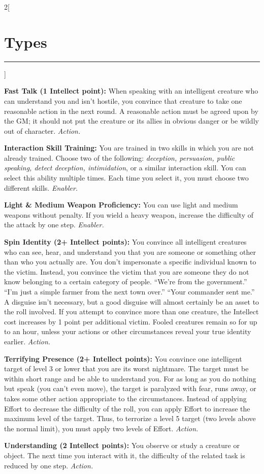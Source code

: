 \documentclass[a4paper,10pt,final]{book}
\newcommand{\HRule}{\rule{\linewidth}{0.5mm}} %
\newcommand{\newSection}[1]{\section*{#1} \addcontentsline{toc}{section}{#1} \label{sec:#1} \HRule}
\newcommand{\itemAbility}[2]{\textcolor{25gray}{\textbullet\textbf{ #1:}} {#2}\par}
\newcommand{\enabler}{\textit{ Enabler.}}
\newcommand{\action}{\textit{ Action.}}
\newenvironment{docsection}[1]
{
  \begin{multicols*}{2}[\newSection{#1}]
}
{
  \end{multicols*}
  \newpage
}
\begin{document}
\begin{docsection}{Types}
\itemAbility{Fast Talk (1 Intellect point)}{When
speaking with an intelligent creature who
can understand you and isn’t hostile,
you convince that creature to take one
reasonable action in the next round. A
reasonable action must be agreed upon by
the GM; it should not put the creature or its
allies in obvious danger or be wildly out of
character.\action}

\itemAbility{Interaction Skill Training}{You are trained in two
skills in which you are not already trained.
Choose two of the following: \textit{deception,
persuasion, public speaking, detect deception, intimidation}, or a similar interaction skill. You can select
this ability multiple times. Each time you
select it, you must choose two different
skills.\enabler}

\itemAbility{Light \& Medium Weapon Proficiency}{You can use light and medium
weapons without penalty. If you wield a
heavy weapon, increase the difficulty of the
attack by one step.\enabler}

\itemAbility{Spin Identity (2+ Intellect points)}{You
convince all intelligent creatures who can
see, hear, and understand you that you are
someone or something other than who
you actually are. You don’t impersonate
a specific individual known to the victim.
Instead, you convince the victim that you
are someone they do not know belonging
to a certain category of people. “We’re from
the government.” “I’m just a simple farmer
from the next town over.” “Your commander
sent me.” A disguise isn’t necessary, but a
good disguise will almost certainly be an
asset to the roll involved. If you attempt
to convince more than one creature, the
Intellect cost increases by 1 point per
additional victim. Fooled creatures remain
so for up to an hour, unless your actions
or other circumstances reveal your true
identity earlier.\action}

\itemAbility{Terrifying Presence (2+ Intellect points)}{
You convince one intelligent target of level
3 or lower that you are its worst nightmare.
The target must be within short range and
be able to understand you. For as long as
you do nothing but speak (you can’t even
move), the target is paralyzed with fear,
runs away, or takes some other action
appropriate to the circumstances. Instead
of applying Effort to decrease the difficulty
of the roll, you can apply Effort to increase
the maximum level of the target. Thus, to terrorize a level 5 target (two levels above
the normal limit), you must apply two levels
of Effort.\action}

\itemAbility{Understanding (2 Intellect points)}{You
observe or study a creature or object. The
next time you interact with it, the difficulty
of the related task is reduced by one step.\action}


\end{docsection}
\end{document}

